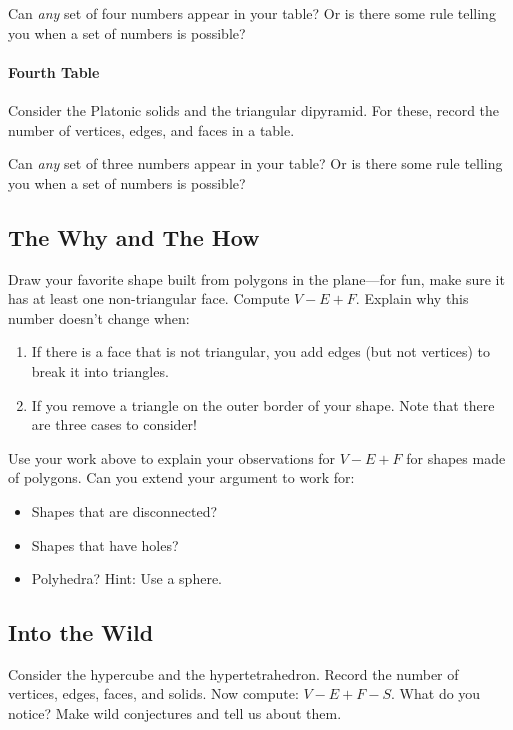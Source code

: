 \begin{prob}
Can \textit{any} set of four numbers appear in your table? Or is
there some rule telling you when a set of numbers is possible? 
\end{prob}


\paragraph{Fourth Table}

\begin{prob}
Consider the Platonic solids and the triangular dipyramid. For these,
record the number of vertices, edges, and faces in a table.
\end{prob}


\begin{prob}
Can \textit{any} set of three numbers appear in your table? Or is
there some rule telling you when a set of numbers is possible? 
\end{prob}



\subsection*{The Why and The How}


\begin{prob}
Draw your favorite shape built from polygons in the plane---for fun,
make sure it has at least one non-triangular face. Compute
$V-E+F$. Explain why this number doesn't change when:
\begin{enumerate}
\item If there is a face that is not triangular, you add edges (but not vertices) to break it into triangles. 
\item If you remove a triangle on the outer border of your shape. Note that there are three cases to consider!
\end{enumerate}
\end{prob}

\begin{prob}
Use your work above to explain your observations for $V-E+F$ for
shapes made of polygons. Can you extend your argument to work for: 
\begin{itemize}
\item Shapes that are disconnected? 
\item Shapes that have holes?
\item Polyhedra? Hint: Use a sphere.
\end{itemize} 
\end{prob}



\subsection*{Into the Wild}

\begin{prob}
Consider the hypercube and the hypertetrahedron. Record the number of
vertices, edges, faces, and solids. Now compute: $V-E+F-S$. What do
you notice? Make wild conjectures and tell us about them.
\end{prob}



